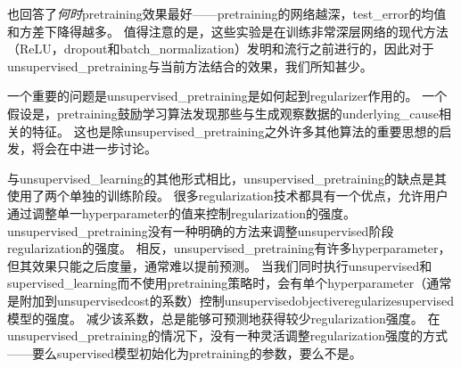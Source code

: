 \cite{Erhan+al-2010-small}也回答了\emph{何时}\gls{pretraining}效果最好——\gls{pretraining}的网络越深，\gls{test_error}的均值和方差下降得越多。
值得注意的是，这些实验是在训练非常深层网络的现代方法（\gls{ReLU}，\gls{dropout}和\gls{batch_normalization}）发明和流行之前进行的，因此对于\gls{unsupervised_pretraining}与当前方法结合的效果，我们所知甚少。


一个重要的问题是\gls{unsupervised_pretraining}是如何起到\gls{regularizer}作用的。
一个假设是，\gls{pretraining}鼓励学习算法发现那些与生成观察数据的\gls{underlying_cause}相关的特征。
这也是除\gls{unsupervised_pretraining}之外许多其他算法的重要思想的启发，将会在中进一步讨论。%


与\gls{unsupervised_learning}的其他形式相比，\gls{unsupervised_pretraining}的缺点是其使用了两个单独的训练阶段。
很多\gls{regularization}技术都具有一个优点，允许用户通过调整单一\gls{hyperparameter}的值来控制\gls{regularization}的强度。
\gls{unsupervised_pretraining}没有一种明确的方法来调整\gls{unsupervised}阶段\gls{regularization}的强度。
相反，\gls{unsupervised_pretraining}有许多\gls{hyperparameter}，但其效果只能之后度量，通常难以提前预测。
当我们同时执行\gls{unsupervised}和\gls{supervised_learning}而不使用\gls{pretraining}策略时，会有单个\gls{hyperparameter}（通常是附加到\gls{unsupervised}\gls{cost}的系数）控制\gls{unsupervised}\gls{objective}\gls{regularize}\gls{supervised}模型的强度。
减少该系数，总是能够可预测地获得较少\gls{regularization}强度。
在\gls{unsupervised_pretraining}的情况下，没有一种灵活调整\gls{regularization}强度的方式——要么\gls{supervised}模型初始化为\gls{pretraining}的参数，要么不是。


